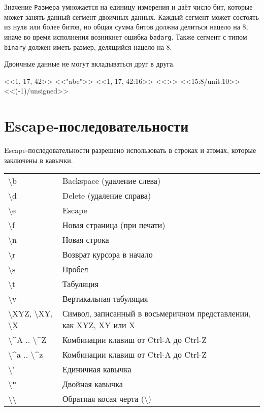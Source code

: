 Значение \texttt{Размера} умножается на единицу измерения и даёт число бит, которые
может занять данный сегмент двоичных данных. Каждый сегмент может состоять из нуля
или более битов, но общая сумма битов должна делиться нацело на 8, иначе во время 
исполнения возникнет ошибка \texttt{badarg}. Также сегмент с типом \texttt{binary}
должен иметь размер, делящийся нацело на 8.

Двоичные данные не могут вкладываться друг в друга.

\begin{erlang}
<<1, 17, 42>>       %
<<"abc">>           %
<<1, 17, 42:16>>    %
<<>>                %
<<15:8/unit:10>>    %
<<(-1)/unsigned>>   %
\end{erlang}


\section{Escape-последовательности}
\label{datatypes:escapeseq}
Escape-последовательности разрешено использовать в строках и атомах, которые 
заключены в кавычки.

\begin{center}
\begin{tabular}{|>{\raggedright}p{91pt}|>{\raggedright}p{229pt}|}
\hline
\multicolumn{2}{|p{321pt}|}{Escape-последовательности}\tabularnewline
\hline
\textbackslash{}b & Backspace (удаление слева)\tabularnewline
\hline
\textbackslash{}d & Delete (удаление справа)\tabularnewline
\hline
\textbackslash{}e & Escape\tabularnewline
\hline
\textbackslash{}f & Новая страница (при печати)\tabularnewline
\hline
\textbackslash{}n & Новая строка\tabularnewline
\hline
\textbackslash{}r & Возврат курсора в начало\tabularnewline
\hline
\textbackslash{}s & Пробел\tabularnewline
\hline
\textbackslash{}t & Табуляция\tabularnewline
\hline
\textbackslash{}v & Вертикальная табуляция\tabularnewline
\hline
\textbackslash{}XYZ, \textbackslash{}XY, \textbackslash{}X &
Символ, записанный в восьмеричном представлении, как XYZ, XY или X\tabularnewline
\hline
\textbackslash{}\textasciicircum{}A .. \textbackslash{}\textasciicircum{}Z & 
Комбинации клавиш от Ctrl-A до Ctrl-Z\tabularnewline
\hline
\textbackslash{}\textasciicircum{}a .. \textbackslash{}\textasciicircum{}z &
Комбинации клавиш от Ctrl-A до Ctrl-Z\tabularnewline
\hline
\textbackslash{}' & Единичная кавычка \tabularnewline
\hline
\textbackslash{}\textbf{\texttt{"}} & Двойная кавычка \tabularnewline
\hline
\textbackslash{}\textbackslash{} & Обратная косая черта (\textbackslash) 
\tabularnewline
\hline
\end{tabular}
\end{center}



